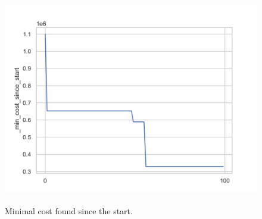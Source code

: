 \begin{figure}[h]
	\begin{centering}
		{\includegraphics[scale=0.5]{figures/experiments/min_cost.png}}
		\caption{Minimal cost found since the start.}
		\label{fig:min_cost}
	\end{centering}
\end{figure}

